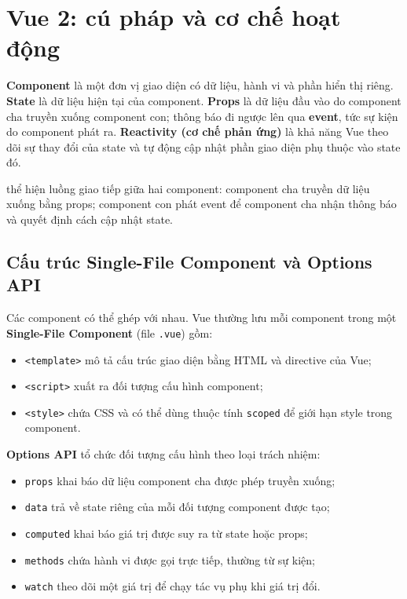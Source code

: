\Needspace{0.30\textheight}
\section{Vue 2: cú pháp và cơ chế hoạt động}

\textbf{Component} là một đơn vị giao diện có dữ liệu, hành vi và phần hiển thị riêng.
\textbf{State} là dữ liệu hiện tại của component. \textbf{Props} là dữ liệu đầu vào
do component cha truyền xuống component con; thông báo đi ngược lên qua
\textbf{event}, tức sự kiện do
component phát ra. \textbf{Reactivity (cơ chế phản ứng)} là khả năng Vue theo dõi
sự thay đổi của state và tự động cập nhật phần giao diện phụ thuộc vào state đó.

 thể hiện luồng giao tiếp giữa hai component: component
cha truyền dữ liệu xuống bằng props; component con phát event để component cha nhận
thông báo và quyết định cách cập nhật state.

\begin{center}
\resizebox{0.52\textwidth}{!}{}
\label{fig:vue-props-events}
\end{center}

\subsection{Cấu trúc Single-File Component và Options API}

Các component có thể ghép với nhau. Vue thường lưu mỗi component trong một
\textbf{Single-File Component} (file \texttt{.vue}) gồm:

\begin{itemize}
  \item \texttt{<template>} mô tả cấu trúc giao diện bằng HTML và directive của Vue;
  \item \texttt{<script>} xuất ra đối tượng cấu hình component;
  \item \texttt{<style>} chứa CSS và có thể dùng thuộc tính \texttt{scoped} để giới
  hạn style trong component.
\end{itemize}

\textbf{Options API} tổ chức đối tượng cấu hình theo loại trách nhiệm:

\begin{itemize}
  \item \texttt{props} khai báo dữ liệu component cha được phép truyền xuống;
  \item \texttt{data} trả về state riêng của mỗi đối tượng component được tạo;
  \item \texttt{computed} khai báo giá trị được suy ra từ state hoặc props;
  \item \texttt{methods} chứa hành vi được gọi trực tiếp, thường từ sự kiện;
  \item \texttt{watch} theo dõi một giá trị để chạy tác vụ phụ khi giá trị đổi.
\end{itemize}

